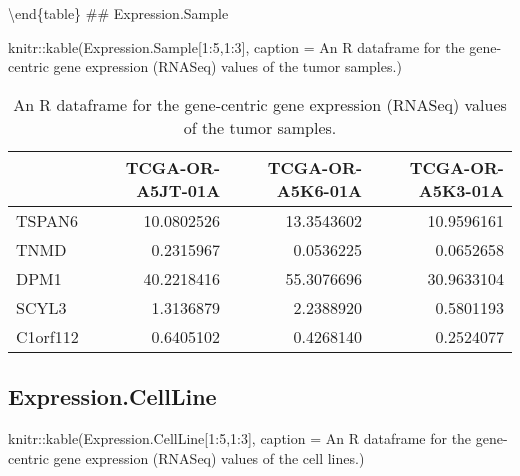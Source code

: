 \documentclass[]{article}
\newcommand{\hlnum}[1]{\textcolor[rgb]{0.816,0.125,0.439}{#1}}%
\newcommand{\hlstr}[1]{\textcolor[rgb]{0.251,0.627,0.251}{#1}}%
\newcommand{\hlstd}[1]{\textcolor[rgb]{0.251,0.251,0.251}{#1}}%
\newenvironment{Shaded}{\begin{myshaded}}{\end{myshaded}}
\newcommand{\DecValTok}[1]{\hlnum{#1}}
\newcommand{\SpecialCharTok}[1]{\hlstr{#1}}
\newcommand{\StringTok}[1]{\hlstr{#1}}
\newcommand{\FunctionTok}[1]{\hlstd{#1}}
\newcommand{\AttributeTok}[1]{{#1}}
\newcommand{\NormalTok}[1]{\hlstd{#1}}
\begin{document}
\textbackslash end\{table\}
\#\# Expression.Sample

\begin{Shaded}
\begin{Highlighting}[]
\NormalTok{knitr}\SpecialCharTok{::}\FunctionTok{kable}\NormalTok{(Expression.Sample[}\DecValTok{1}\SpecialCharTok{:}\DecValTok{5}\NormalTok{,}\DecValTok{1}\SpecialCharTok{:}\DecValTok{3}\NormalTok{], }\AttributeTok{caption =} \StringTok{\textquotesingle{}An R dataframe for the gene{-}centric gene expression (RNASeq) values of the tumor samples.\textquotesingle{}}\NormalTok{)}
\end{Highlighting}
\end{Shaded}

\begin{table}

\caption{\label{tab:unnamed-chunk-63}An R dataframe for the gene-centric gene expression (RNASeq) values of the tumor samples.}
\centering
\begin{tabular}[t]{l|r|r|r}
\hline
  & TCGA-OR-A5JT-01A & TCGA-OR-A5K6-01A & TCGA-OR-A5K3-01A\\
\hline
TSPAN6 & 10.0802526 & 13.3543602 & 10.9596161\\
\hline
TNMD & 0.2315967 & 0.0536225 & 0.0652658\\
\hline
DPM1 & 40.2218416 & 55.3076696 & 30.9633104\\
\hline
SCYL3 & 1.3136879 & 2.2388920 & 0.5801193\\
\hline
C1orf112 & 0.6405102 & 0.4268140 & 0.2524077\\
\hline
\end{tabular}
\end{table}

\hypertarget{expression.cellline}{%
\subsection{\texorpdfstring{ Expression.CellLine}{  Expression.CellLine}}\label{expression.cellline}}

\begin{Shaded}
\begin{Highlighting}[]
\NormalTok{knitr}\SpecialCharTok{::}\FunctionTok{kable}\NormalTok{(Expression.CellLine[}\DecValTok{1}\SpecialCharTok{:}\DecValTok{5}\NormalTok{,}\DecValTok{1}\SpecialCharTok{:}\DecValTok{3}\NormalTok{], }\AttributeTok{caption =} \StringTok{\textquotesingle{}An R dataframe for the gene{-}centric gene expression (RNASeq) values of the cell lines.\textquotesingle{}}\NormalTok{)}
\end{Highlighting}
\end{Shaded}
\end{document}
